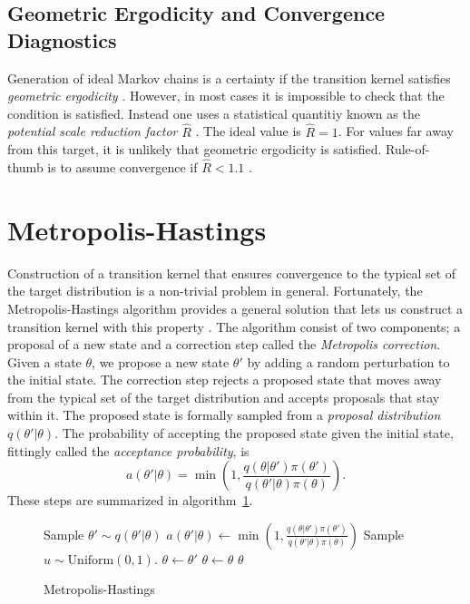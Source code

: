 \subsection{Geometric Ergodicity and Convergence Diagnostics}
Generation of ideal Markov chains is a certainty if the transition kernel satisfies \textit{geometric ergodicity} \cite{geometric_ergodicity}.
However, in most cases it is impossible to check that the condition is satisfied. Instead one uses a statistical quantitiy known
as the \textit{potential scale reduction factor} $\hat{R}$ \cite{rhat}. The ideal value is $\hat{R} = 1$. For values far away from this target,
it is unlikely that geometric ergodicity is satisfied. Rule-of-thumb is to assume convergence
if $\hat{R} < 1.1$ \cite{convergence_diagnostics}.



\section{Metropolis-Hastings}
Construction of a transition kernel that ensures convergence to the typical set of the target distribution is a non-trivial problem in general.
Fortunately, the Metropolis-Hastings algorithm provides a general solution that lets us construct 
a transition kernel with this property \cite{metropolis,metropolis_two}. 
The algorithm consist of two components; a proposal of a new state and a correction step called the \textit{Metropolis correction}.
Given a state $\theta$, we propose a new state $\theta'$ by adding a random perturbation to the initial state.
The correction step rejects a proposed state that moves away from the typical set of the target distribution
and accepts proposals that stay within it.
The proposed state is formally sampled from a \textit{proposal distribution} $q(\theta'|\theta)$.
The probability of accepting the proposed state given the initial state, fittingly called the \textit{acceptance probability}, is 
\begin{equation}\label{eq:general_acceptance_prob}
    a(\theta'|\theta) = \min \left(1, \frac{q(\theta|\theta')\pi(\theta')}{q(\theta'|\theta)\pi (\theta)}\right).
\end{equation}
These steps are summarized in algorithm~\ref{algo:general_metropolis}.
\begin{figure}[H]
    \begin{algorithm}[H]
      \caption{Metropolis-Hastings}\label{algo:general_metropolis}
      \begin{algorithmic}
        \State Sample $\theta' \sim q(\theta'|\theta)$
        \State $\displaystyle{a(\theta'|\theta) \leftarrow \min \left(1, \frac{q(\theta|\theta')\pi(\theta')}{q(\theta'|\theta)\pi (\theta)}\right)}$
        \State Sample $u \sim \text{Uniform}(0,1)$.
          \State $\theta \leftarrow \theta'$ 
        \Else
          \State $\theta \leftarrow \theta$  
        \EndIf 
        \State \Return $\theta$
        \EndFunction
      \end{algorithmic}
    \end{algorithm}
  \end{figure}


